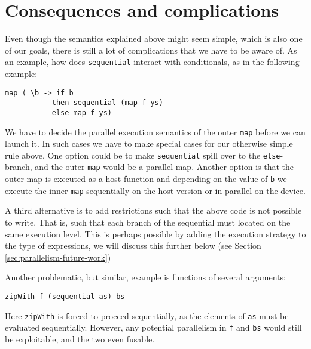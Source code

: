 \section{Consequences and complications}
\label{sec:sequential-complications}

Even though the semantics explained above might seem simple, which is
also one of our goals, there is still a lot of complications that we
have to be aware of. As an example, how does \lstinline{sequential}
interact with conditionals, as in the following example:
\begin{lstlisting}
map ( \b -> if b
           then sequential (map f ys)
           else map f ys)
\end{lstlisting}
We have to decide the parallel execution semantics of the outer
\lstinline{map} before we can launch it. In such cases we have to make
special cases for our otherwise simple rule above. One option could be
to make \lstinline{sequential} spill over to the
\lstinline{else}-branch, and the outer \lstinline{map} would be a
parallel map. Another option is that the outer map is executed as a
host function and depending on the value of \lstinline{b} we
execute the inner \lstinline{map} sequentially on the host version or
in parallel on the device.

A third alternative is to add restrictions such that the above code is
not possible to write. That is, such that each branch of the
sequential must located on the same execution level. This is perhaps
possible by adding the execution strategy to the type of expressions,
we will discuss this further below (see Section \ref{sec:parallelism-future-work})

Another problematic, but similar, example is functions of several arguments:
\begin{lstlisting}
zipWith f (sequential as) bs
\end{lstlisting}

Here \lstinline{zipWith} is forced to proceed sequentially, as the elements of
\lstinline{as} must be evaluated sequentially. However, any potential
parallelism in \lstinline{f} and \lstinline{bs} would still be exploitable,
and the two even fusable.

